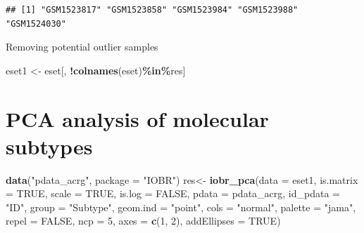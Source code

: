 \documentclass[
  12pt,
]{book}
\newenvironment{Shaded}{\begin{snugshade}}{\end{snugshade}}
\newcommand{\AttributeTok}[1]{\textcolor[rgb]{0.13,0.29,0.53}{#1}}
\newcommand{\ConstantTok}[1]{\textcolor[rgb]{0.56,0.35,0.01}{#1}}
\newcommand{\DecValTok}[1]{\textcolor[rgb]{0.00,0.00,0.81}{#1}}
\newcommand{\FunctionTok}[1]{\textcolor[rgb]{0.13,0.29,0.53}{\textbf{#1}}}
\newcommand{\NormalTok}[1]{#1}
\newcommand{\OtherTok}[1]{\textcolor[rgb]{0.56,0.35,0.01}{#1}}
\newcommand{\SpecialCharTok}[1]{\textcolor[rgb]{0.81,0.36,0.00}{\textbf{#1}}}
\newcommand{\StringTok}[1]{\textcolor[rgb]{0.31,0.60,0.02}{#1}}
\begin{document}
\begin{verbatim}
## [1] "GSM1523817" "GSM1523858" "GSM1523984" "GSM1523988" "GSM1524030"
\end{verbatim}

Removing potential outlier samples

\begin{Shaded}
\begin{Highlighting}[]
\NormalTok{eset1 }\OtherTok{\textless{}{-}}\NormalTok{ eset[, }\SpecialCharTok{!}\FunctionTok{colnames}\NormalTok{(eset)}\SpecialCharTok{\%in\%}\NormalTok{res]}
\end{Highlighting}
\end{Shaded}

\hypertarget{pca-analysis-of-molecular-subtypes}{%
\section{PCA analysis of molecular subtypes}\label{pca-analysis-of-molecular-subtypes}}

\begin{Shaded}
\begin{Highlighting}[]
\FunctionTok{data}\NormalTok{(}\StringTok{"pdata\_acrg"}\NormalTok{, }\AttributeTok{package =} \StringTok{"IOBR"}\NormalTok{)}
\NormalTok{res}\OtherTok{\textless{}{-}} \FunctionTok{iobr\_pca}\NormalTok{(}\AttributeTok{data       =}\NormalTok{ eset1,}
              \AttributeTok{is.matrix   =} \ConstantTok{TRUE}\NormalTok{,}
              \AttributeTok{scale       =} \ConstantTok{TRUE}\NormalTok{,}
              \AttributeTok{is.log      =} \ConstantTok{FALSE}\NormalTok{,}
              \AttributeTok{pdata       =}\NormalTok{ pdata\_acrg, }
              \AttributeTok{id\_pdata    =} \StringTok{"ID"}\NormalTok{, }
              \AttributeTok{group       =} \StringTok{"Subtype"}\NormalTok{,}
              \AttributeTok{geom.ind    =} \StringTok{"point"}\NormalTok{, }
              \AttributeTok{cols        =} \StringTok{"normal"}\NormalTok{,}
              \AttributeTok{palette     =} \StringTok{"jama"}\NormalTok{, }
              \AttributeTok{repel       =} \ConstantTok{FALSE}\NormalTok{,}
              \AttributeTok{ncp         =} \DecValTok{5}\NormalTok{,}
              \AttributeTok{axes        =} \FunctionTok{c}\NormalTok{(}\DecValTok{1}\NormalTok{, }\DecValTok{2}\NormalTok{),}
              \AttributeTok{addEllipses =} \ConstantTok{TRUE}\NormalTok{)}
\end{Highlighting}
\end{Shaded}
\end{document}
